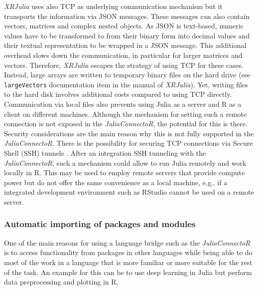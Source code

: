 \documentclass[12pt]{article}
\newcommand{\inlinecode}[1]{\texttt{#1}}
\newcommand{\apkg}[1]{\emph{#1}}
\begin{document}
\apkg{XRJulia} uses also TCP as underlying communication mechanism but it transports the information via JSON messages.
These messages can also contain vectors, matrices and complex nested objects.
As JSON is text-based, numeric values have to be transformed to from their binary form into decimal values and their textual representation to be wrapped in a JSON message.
This additional overhead slows down the communication, in particular for larger matrices and vectors.
Therefore, \apkg{XRJulia} escapes the strategy of using TCP for these cases.
Instead, large arrays are written to temporary binary files on the hard drive (see \inlinecode{largeVectors} documentation item in the manual of \apkg{XRJulia}).
Yet, writing files to the hard disk involves additional costs compared to using TCP directly.
Communication via local files also prevents using Julia as a server and R as a client on different machines.
Although the mechanism for setting such a remote connection is not exposed in the \apkg{JuliaConnectoR}, the potential for this is there.
Security considerations are the main reason why this is not fully supported in the \apkg{JuliaConnectoR}.
There is the possibility for securing TCP connections via Secure Shell (SSH) tunnels \citep{ylonen_ssh}.
After an integration SSH tunneling with the \apkg{JuliaConnectoR}, such a mechanism could allow to run Julia remotely and work locally in R.
This may be used to employ remote servers that provide compute power but do not offer the same convenience as a local machine, e.g., if a integrated development environment such as RStudio \citep{rstudio} cannot be used on a remote server.


\subsubsection{Automatic importing of packages and modules}\label{juliaconnectoRAutoimport}

One of the main reasons for using a language bridge such as the \apkg{JuliaConnectoR} is to access functionality from packages in other languages while being able to do most of the work in a language that is more familiar or more suitable for the rest of the task.
An example for this can be to use deep learning in Julia but perform data preprocessing and plotting in R.
\end{document}
